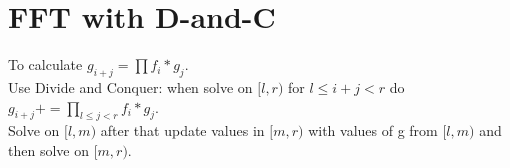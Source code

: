 \section{FFT with D-and-C}

To calculate $g_{i + j} = \prod f_i * g_j$.\\

Use Divide and Conquer: when solve on $[l, r)$ for $l \le i + j < r$ do $g_{i + j} += \prod_{l \le j < r} f_i * g_j$.\\

Solve on $[l, m)$ after that update values in $[m, r)$ with values of g from $[l, m)$ and then solve on $[m, r)$. 

